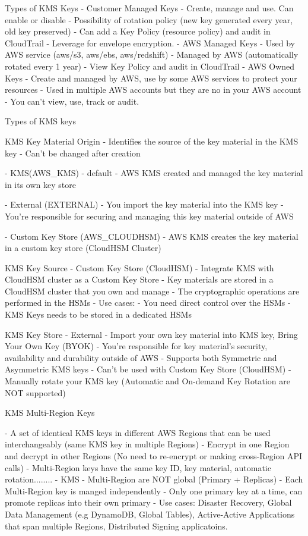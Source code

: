 \documentclass[11pt]{book}
\begin{document}
    Types of KMS Keys
    - Customer Managed Keys
        - Create, manage and use. Can enable or disable
        - Possibility of rotation policy (new key generated every year, old key preserved)
        - Can add a Key Policy (resource policy) and audit in CloudTrail
        - Leverage for envelope encryption.
    - AWS Managed Keys
        - Used by AWS service (aws/s3, aws/ebs, aws/redshift)
        - Managed by AWS (automatically rotated every 1 year)
        - View Key Policy and audit in CloudTrail
    - AWS Owned Keys
        - Create and managed by AWS, use by some AWS services to protect your resources
        - Used in multiple AWS accounts but they are no in your AWS account
        - You can't view, use, track or audit.

    Types of KMS keys

    KMS Key Material Origin
    - Identifies the source of the key material in the KMS key
    - Can't be changed after creation

    - KMS(AWS_KMS) - default
        - AWS KMS created and managed the key material in its own key store

    - External (EXTERNAL)
        - You import the key material into the KMS key
        - You're responsible for securing and managing this key material outside of AWS

    - Custom Key Store (AWS_CLOUDHSM)
        - AWS KMS creates the key material in a custom key store (CloudHSM Cluster)

    KMS Key Source - Custom Key Store (CloudHSM)
    - Integrate KMS with CloudHSM cluster as a Custom Key Store
    - Key materials are stored in a CloudHSM cluster that you own and manage
    - The cryptographic operations are performed in the HSMs
    - Use cases:
        - You need direct control over the HSMs
        - KMS Keys needs to be stored in a dedicated HSMs

    KMS Key Store - External
    - Import your own key material into KMS key, Bring Your Own Key (BYOK)
    - You're responsible for key material's security, availability and durability outside of AWS
    - Supports both Symmetric and Asymmetric KMS keys
    - Can't be used with Custom Key Store (CloudHSM)
    - Manually rotate your KMS key (Automatic and On-demand Key Rotation are NOT supported)


    KMS Multi-Region Keys

    - A set of identical KMS keys in different AWS Regions that can be used interchangeably (same KMS key in multiple Regions)
    - Encrypt in one Region and decrypt in other Regions (No need to re-encrypt or making cross-Region API calls)
    - Multi-Region keys have the same key ID, key material, automatic rotation........
    - KMS - Multi-Region are NOT global (Primary + Replicas)
    - Each Multi-Region key is manged independently
    - Only one primary key at a time, can promote replicas into their own primary
    - Use cases: Disaster Recovery, Global Data Management (e.g DynamoDB, Global Tables), Active-Active Applications that span multiple Regions, Distributed Signing applicatoins.
\end{document}
